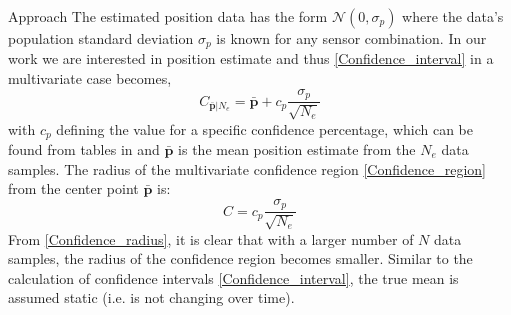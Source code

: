 \begin{section}{Approach}
The estimated position data has the form $\mathcal{N}(0,\sigma_p)$ where the data's population standard deviation $\sigma_p$ is known for any sensor combination. In our work we are interested in position estimate and thus \eqref{Confidence_interval} in a multivariate case becomes,
    \begin{equation}
    \label{Confidence_region}
		C_{\bar{\bm{p}}|N_e} = \bar{\bm{p}} + c_p\frac{\sigma_p}{\sqrt{N_e}}
	\end{equation}
with $c_p$ defining the value for a specific confidence percentage, which can be found from tables in \cite{devore2011probability} and $\bar{\bm{p}}$ is the mean position estimate from the $N_e$ data samples. The radius of the multivariate confidence region \eqref{Confidence_region} from the center point $\bar{\bm{p}}$ is:
    \begin{equation}
    \label{Confidence_radius}
		C = c_p\frac{\sigma_p}{\sqrt{N_e}}
	\end{equation}
From \eqref{Confidence_radius}, it is clear that with a larger number of $N$ data samples, the radius of the confidence region becomes smaller. Similar to the calculation of confidence intervals \eqref{Confidence_interval}, the true mean is assumed static (i.e. is not changing over time). 




\end{section}
